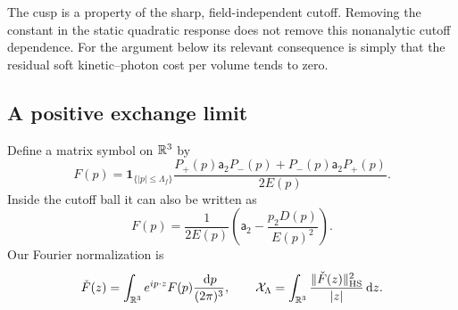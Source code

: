 The cusp is a property of the sharp, field-independent cutoff. Removing
the constant in the static quadratic response does not remove this
nonanalytic cutoff dependence. For the argument below its relevant
consequence is simply that the residual soft kinetic--photon cost per
volume tends to zero.

\subsection{A positive exchange limit}

Define a matrix symbol on \(\mathbb R^3\) by
\begin{equation}
 F(p)=\mathbf1_{\{|p|\leq\Lambda_f\}}
 \frac{P_+(p)\mathsf a_2P_-(p)+P_-(p)\mathsf a_2P_+(p)}{2E(p)}.
 \label{pv-symbol}
\end{equation}
Inside the cutoff ball it can also be written as
\[
 F(p)=\frac1{2E(p)}
       \left(\mathsf a_2-\frac{p_2D(p)}{E(p)^2}\right).
\]
Our Fourier normalization is
\[
 \check F(z)=\int_{\mathbb R^3}e^{ip\cdot z}F(p)\frac{\,\mathrm d p}{(2\pi)^3},
 \qquad
 \mathcal X_\Lambda=
       \int_{\mathbb R^3}\frac{\|\check F(z)\|_{\mathrm{HS}}^2}{|z|}\,\mathrm d z.
\]

